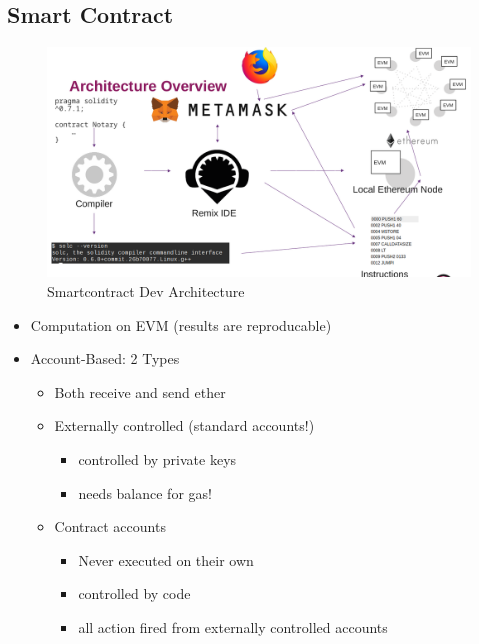 \documentclass[../Main.tex]{subfiles}
\begin{document}
\subsection{Smart Contract}
\begin{figure}[H]
    \centering
    \includegraphics[width=0.75\linewidth]{Images/blockchain/smart-contract-arch.png}
    \caption{Smartcontract Dev Architecture}
\end{figure}

\begin{itemize}
    \item Computation on EVM (results are reproducable)
    \item Account-Based: 2 Types
          \begin{itemize}
              \item Both receive and send ether
              \item Externally controlled (standard accounts!)
                    \begin{itemize}
                        \item controlled by private keys
                        \item needs balance for gas!
                    \end{itemize}
              \item Contract accounts
                    \begin{itemize}
                        \item Never executed on their own
                        \item controlled by code
                        \item all action fired from externally controlled accounts
                    \end{itemize}
          \end{itemize}
\end{itemize}
\end{document}

